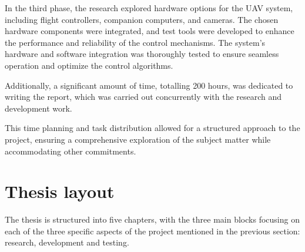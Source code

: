 In the third phase, the research explored hardware options for the UAV system, including flight controllers, companion computers, and cameras. The chosen hardware components were integrated, and test tools were developed to enhance the performance and reliability of the control mechanisms. The system's hardware and software integration was thoroughly tested to ensure seamless operation and optimize the control algorithms.


Additionally, a significant amount of time, totalling 200 hours, was dedicated to writing the report, which was carried out concurrently with the research and development work.

This time planning and task distribution allowed for a structured approach to the project, ensuring a comprehensive exploration of the subject matter while accommodating other commitments.

\section{Thesis layout}
\label{sec:layout}



The thesis is structured into five chapters, with the three main blocks focusing on each of the three specific aspects of the project mentioned in the previous section: research, development and testing. 

